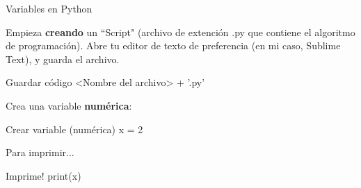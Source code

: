 \begin{frame}[t]{Variables en Python}\vspace{10pt}

Empieza \textbf{creando} un ``Script" (archivo de extención .py que contiene el algoritmo de programación). Abre tu editor de texto de preferencia (en mi caso, Sublime Text), y guarda el archivo.

\begin{block}{Guardar código}
	<Nombre del archivo> + '.py'
\end{block}

Crea una variable \textbf{numérica}:

\begin{block}{Crear variable (numérica)}
	x = 2
\end{block}

Para imprimir...
\begin{block}{Imprime!}
	print(x)
\end{block}

\end{frame}